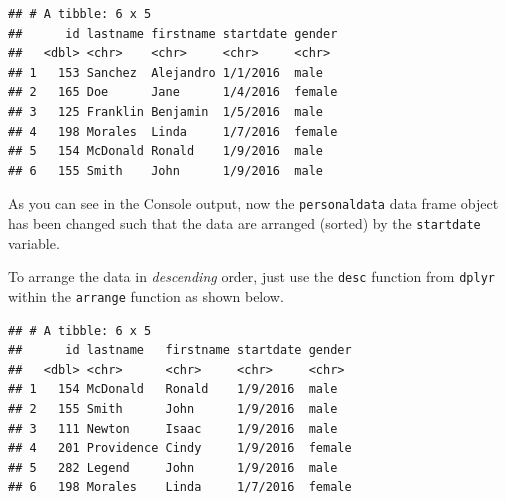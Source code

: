 \documentclass[]{book}
\newenvironment{Shaded}{\begin{snugshade}}{\end{snugshade}}
\newcommand{\KeywordTok}[1]{\textcolor[rgb]{0.13,0.29,0.53}{\textbf{#1}}}
\newcommand{\StringTok}[1]{\textcolor[rgb]{0.31,0.60,0.02}{#1}}
\newcommand{\CommentTok}[1]{\textcolor[rgb]{0.56,0.35,0.01}{\textit{#1}}}
\newcommand{\OperatorTok}[1]{\textcolor[rgb]{0.81,0.36,0.00}{\textbf{#1}}}
\newcommand{\NormalTok}[1]{#1}
\begin{document}
\begin{Shaded}
\end{Shaded}

\begin{verbatim}
## # A tibble: 6 x 5
##      id lastname firstname startdate gender
##   <dbl> <chr>    <chr>     <chr>     <chr> 
## 1   153 Sanchez  Alejandro 1/1/2016  male  
## 2   165 Doe      Jane      1/4/2016  female
## 3   125 Franklin Benjamin  1/5/2016  male  
## 4   198 Morales  Linda     1/7/2016  female
## 5   154 McDonald Ronald    1/9/2016  male  
## 6   155 Smith    John      1/9/2016  male
\end{verbatim}

As you can see in the Console output, now the \texttt{personaldata} data
frame object has been changed such that the data are arranged (sorted)
by the \texttt{startdate} variable.

To arrange the data in \emph{descending} order, just use the
\texttt{desc} function from \texttt{dplyr} within the \texttt{arrange}
function as shown below.

\begin{Shaded}
\end{Shaded}

\begin{verbatim}
## # A tibble: 6 x 5
##      id lastname   firstname startdate gender
##   <dbl> <chr>      <chr>     <chr>     <chr> 
## 1   154 McDonald   Ronald    1/9/2016  male  
## 2   155 Smith      John      1/9/2016  male  
## 3   111 Newton     Isaac     1/9/2016  male  
## 4   201 Providence Cindy     1/9/2016  female
## 5   282 Legend     John      1/9/2016  male  
## 6   198 Morales    Linda     1/7/2016  female
\end{verbatim}
\end{document}
